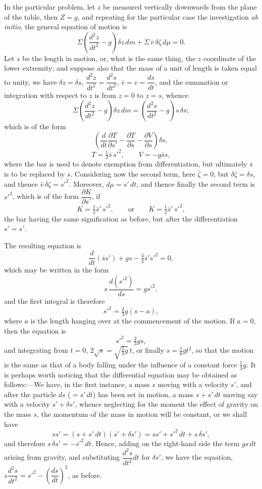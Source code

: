 \documentclass[11pt,a4paper]{book}
\theoremstyle{plain}
\begin{document}
In the particular problem, let $z$ be measured vertically downwards from the plane of the table, then $Z=g$, and repeating for the particular case the investigation \textit{ab initio}, the general equation of motion is
\[
\Sigma\left(\frac{d^2z}{dt^2}-g\right)\delta z\,dm+\Sigma\,\bar{v}\,\delta\zeta\,d\mu=0.
\]
Let $s$ be the length in motion, or, what is the same thing, the $z$ coordinate of the lower extremity; and suppose also that the mass of a unit of length is taken equal to unity, we have $\delta z=\delta s$, $\dfrac{d^2z}{dt^2}=\dfrac{d^2s}{dt^2}$, $\bar{v}=v=\dfrac{ds}{dt}$, and the summation or integration with respect to $z$ is from $z=0$ to $z=s$, whence
\[
\Sigma\left(\frac{d^2z}{dt^2}-g\right)\delta z\,dm
=\left(\frac{d^2s}{dt^2}-g\right)s\,\delta s;
\]
which is of the form
\[
\left(\frac{d}{dt}\frac{\partial T}{\partial s'}-\frac{\partial T}{\partial s}-\frac{\partial V}{\partial s}\right)\delta s,
\]
\[
T=\tfrac{1}{2}\bar{s}\,s'^2,\qquad V=-g\bar{s}s,
\]
where the bar is used to denote exemption from differentiation, but ultimately $\bar{s}$ is to be replaced by $s$. Considering now the second term, here $\bar{\zeta}=0$, but $\delta\zeta=\delta s$, and thence $\bar{v}\,\delta\zeta=s'^2$. Moreover, $d\mu=s'\,dt$, and thence finally the second term is $s'^3$, which is of the form $\dfrac{\partial K}{\partial s'}$, if
\[
K=\tfrac{1}{2}\bar{s}'\,s'^2,\qquad \text{or}\qquad K=\tfrac{1}{2}\bar{s}'\,s'^2,
\]
the bar having the same signification as before, but after the differentiation $s'=s'$.

The resulting equation is
\[
\frac{d}{dt}(\bar{s}s')+gs-\tfrac{3}{2}\bar{s}'s'^2=0,
\]
which may be written in the form
\[
s\,\frac{d(s'^2)}{ds}=gs'^2,
\]
and the first integral is therefore
\[
s'^2=\tfrac{2}{3}g(s-a),
\]
where $a$ is the length hanging over at the commencement of the motion. If $a=0$, then the equation is
\[
s'^2=\tfrac{2}{3}gs,
\]
and integrating from $t=0$, $2\sqrt{s}=\sqrt{\tfrac{2}{3}g}\,t$, or finally $s=\tfrac{1}{6}gt^2$, so that the motion is the same as that of a body falling under the influence of a constant force $\tfrac{1}{3}g$. It is perhaps worth noticing that the differential equation may be obtained as follows:---We have, in the first instance, a mass $s$ moving with a velocity $s'$, and after the particle $ds$ ($=s'\,dt$) has been set in motion, a mass $s+s'\,dt$ moving say with a velocity $s'+\delta s'$, whence neglecting for the moment the effect of gravity on the mass $s$, the momentum of the mass in motion will be constant, or we shall have
\[
ss'=(s+s'\,dt)(s'+\delta s')=ss'+s'^2\,dt+s\,\delta s',
\]
and therefore $s\,\delta s'=-s'^2\,dt$. Hence, adding on the right-hand side the term $gs\,dt$ arising from gravity, and substituting $\dfrac{d^2s}{dt^2}dt$ for $\delta s'$, we have the equation, $s\dfrac{d^2s}{dt^2}=s'^2-\left(\dfrac{ds}{dt}\right)^2$, as before.
\newpage
\end{document}
